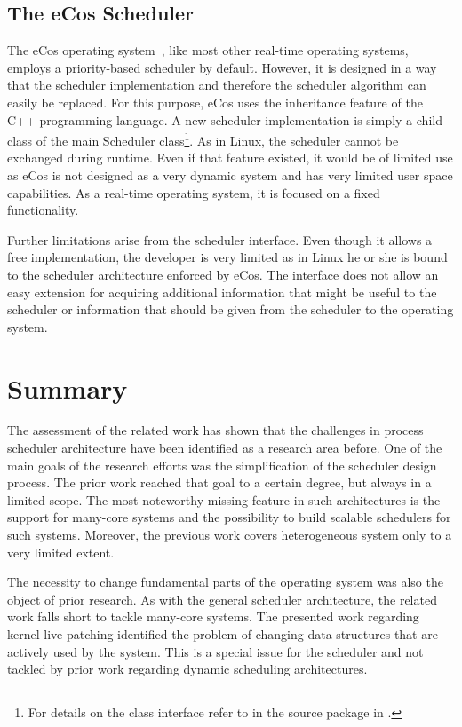 \subsection{The eCos Scheduler}

The eCos operating system~\cite{eCos}, like most other real-time operating systems, employs a priority-based scheduler by default. However, it is designed in a way that the scheduler implementation and therefore the scheduler algorithm can easily be replaced. For this purpose, eCos uses the inheritance feature of the C++ programming language. A new scheduler implementation is simply a child class of the main Scheduler class\footnote{For details on the class interface refer to  in the source package in \cite{eCos}.}. As in Linux, the scheduler cannot be exchanged during runtime. Even if that feature existed, it would be of limited use as eCos is not designed as a very dynamic system and has very limited user space capabilities. As a real-time operating system, it is focused on a fixed functionality.

Further limitations arise from the scheduler interface. Even though it allows a free implementation, the developer is very limited as in Linux he or she is bound to the scheduler architecture enforced by eCos. The interface does not allow an easy extension for acquiring additional information that might be useful to the scheduler or information that should be given from the scheduler to the operating system.

\section{Summary}

The assessment of the related work has shown that the challenges in process scheduler architecture have been identified as a research area before. One of the main goals of the research efforts was the simplification of the scheduler design process. The prior work reached that goal to a certain degree, but always in a limited scope. The most noteworthy missing feature in such architectures is the support for many-core systems and the possibility to build scalable schedulers for such systems. Moreover, the previous work covers heterogeneous system only to a very limited extent.

The necessity to change fundamental parts of the operating system was also the object of prior research. As with the general scheduler architecture, the related work falls short to tackle many-core systems. The presented work regarding kernel live patching identified the problem of changing data structures that are actively used by the system. This is a special issue for the scheduler and not tackled by prior work regarding dynamic scheduling architectures.
